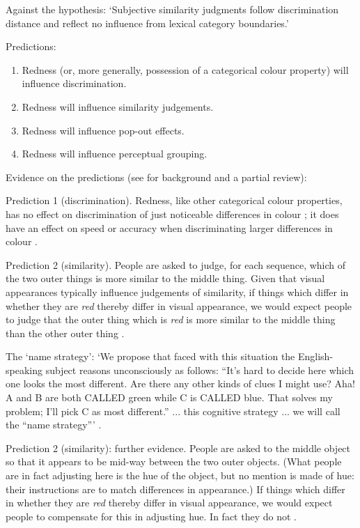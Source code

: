 \documentclass[12pt]{extarticle}
\begin{document}
\begin{multicols*}{3}
Against the hypothesis: ‘Subjective similarity judgments follow
discrimination distance and reflect no influence from lexical category
boundaries.’ \citep[p.~73]{kay_what_1984}

Predictions:
\begin{enumerate}
\item Redness (or, more generally, possession of a categorical colour property) will influence discrimination.
\item Redness will influence similarity judgements.
\item Redness will influence pop-out effects.
\item Redness will influence perceptual grouping.
\end{enumerate}

Evidence on the predictions (see \citealp{witzel:2018_colora} for background and a partial review):

Prediction 1 (discrimination). Redness, like other categorical colour properties, has no effect on discrimination of just noticeable differences in colour \citep{witzel:2013_categorical}; it does have an effect on speed or accuracy when discriminating larger differences in colour \citep{witzel:2014_categorical,witzel:2016_categorical}.

Prediction 2 (similarity). People are asked to judge, for each sequence, which of the two outer
things is more similar to the middle thing. Given that visual appearances typically influence
judgements of similarity, if things which differ in whether they are
\emph{red} thereby differ in visual appearance, we would expect people to
judge that the outer thing which is \emph{red} is more similar to the
middle thing than the other outer thing
\citep{kay_what_1984,witzel2014category}.

The ‘name strategy’: ‘We propose that faced with this situation the
English-speaking subject reasons
unconsciously as follows: “It's hard to decide here which one looks the most
different. Are there any other kinds of clues I might use? Aha! A and B are
both CALLED green while C is CALLED blue. That solves my problem; I'll pick C
as most different.” ... this cognitive strategy ... we will call the
“name strategy”’ \citep[p.~72]{kay_what_1984}.

Prediction 2 (similarity): further evidence. People are asked to the middle object so that it appears to be mid-way
between the two outer objects. (What people are in fact adjusting here is
the hue of the object, but no mention is made of hue: their instructions
are to match differences in appearance.) If things which differ in whether
they are \emph{red} thereby differ in visual appearance, we would expect
people to compensate for this in adjusting hue. In fact they do not
\citep{witzel2014category}.


\end{multicols*}
\end{document}
